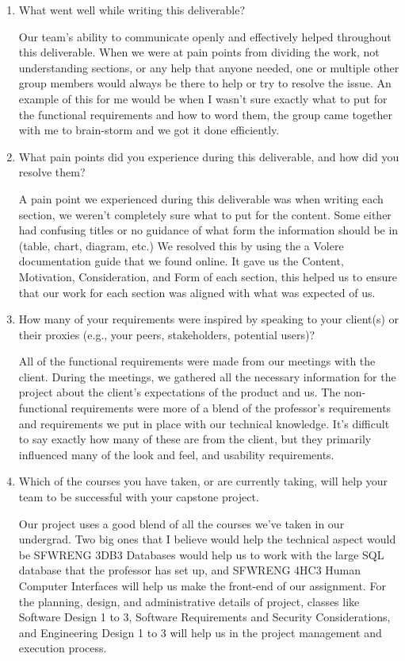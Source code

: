 \begin{enumerate}
 \item What went well while writing this deliverable?

    \par{Our team’s ability to communicate openly and effectively helped throughout this deliverable. When we were at pain points from dividing the work, not understanding sections, or any help that anyone needed, one or multiple other group members would always be there to help or try to resolve the issue. An example of this for me would be when I wasn’t sure exactly what to put for the functional requirements and how to word them, the group came together with me to brain-storm and we got it done efficiently.}
  
  \item What pain points did you experience during this deliverable, and how did you resolve them?

    \par{A pain point we experienced during this deliverable was when writing each section, we weren’t completely sure what to put for the content. Some either had confusing titles or no guidance of what form the information should be in (table, chart, diagram, etc.) We resolved this by using the a Volere documentation guide that we found online. It gave us the Content, Motivation, Consideration, and Form of each section, this helped us to ensure that our work for each section was aligned with what was expected of us.}

  \item How many of your requirements were inspired by speaking to your client(s) or their proxies (e.g., your peers, stakeholders, potential users)?

    \par{All of the functional requirements were made from our meetings with the client. During the meetings, we gathered all the necessary information for the project about the client’s expectations of the product and us. The non-functional requirements were more of a blend of the professor’s requirements and requirements we put in place with our technical knowledge. It’s difficult to say exactly how many of these are from the client, but they primarily influenced many of the look and feel, and usability requirements.}

  \item Which of the courses you have taken, or are currently taking, will help
  your team to be successful with your capstone project.

    \par{Our project uses a good blend of all the courses we’ve taken in our undergrad. Two big ones that I believe would help the technical aspect would be SFWRENG 3DB3 Databases would help us to work with the large SQL database that the professor has set up, and SFWRENG 4HC3 Human Computer Interfaces will help us make the front-end of our assignment. For the planning, design, and administrative details of project, classes like Software Design 1 to 3, Software Requirements and Security Considerations, and Engineering Design 1 to 3 will help us in the project management and execution process.}

\end{enumerate}